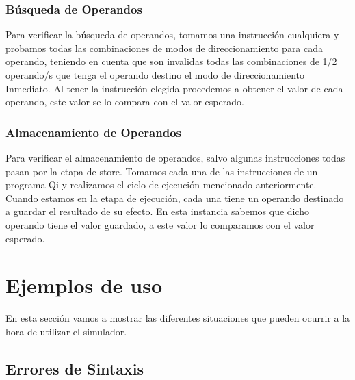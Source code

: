 \subsubsection{Búsqueda de Operandos}

Para verificar la búsqueda de operandos, tomamos una instrucción cualquiera y probamos todas las combinaciones de modos de direccionamiento para cada operando, teniendo en cuenta que son invalidas todas las combinaciones de 1/2 operando/s que tenga el operando destino el modo de direccionamiento Inmediato. Al tener la instrucción elegida procedemos a obtener el valor de cada operando, este valor se lo compara con el valor esperado. 
 
\subsubsection{Almacenamiento de Operandos}

Para verificar el almacenamiento de operandos, salvo algunas instrucciones todas pasan por la etapa de store.
Tomamos cada una de las instrucciones de un programa Qi y realizamos el ciclo de ejecución mencionado anteriormente.
Cuando estamos en la etapa de ejecución, cada una tiene un operando destinado a guardar el resultado de su efecto.
En esta instancia sabemos que  dicho operando tiene el valor guardado, a este valor lo comparamos con el valor esperado.

\section{Ejemplos de uso}

En esta sección vamos a mostrar las diferentes situaciones que pueden ocurrir a la hora de utilizar el simulador.

\subsection{Errores de Sintaxis} 

